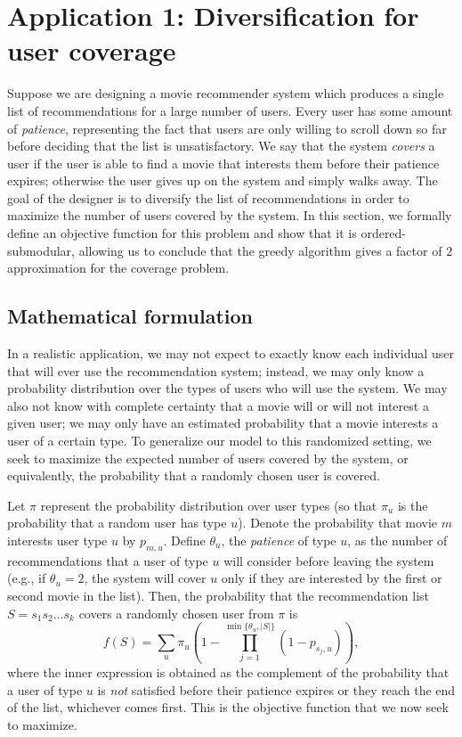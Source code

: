 
% 

\section{Application 1: Diversification for user coverage}\label{sec:coverage}

Suppose we are designing a movie recommender system which produces a single list of recommendations for a large number of users. Every user has some amount of \emph{patience}, representing the fact that users are only willing to scroll down so far before deciding that the list is unsatisfactory. We say that the system \emph{covers} a user if the user is able to find a movie that interests them before their patience expires; otherwise the user gives up on the system and simply walks away. The goal of the designer is to diversify the list of recommendations in order to maximize the number of users covered by the system. In this section, we formally define an objective function for this problem and show that it is ordered-submodular, allowing us to conclude that the greedy algorithm gives a factor of $2$ approximation for the coverage problem.


\subsection{Mathematical formulation}
In a realistic application, we may not expect to exactly know each individual user that will ever use the recommendation system; instead, we may only know a probability distribution over the types of users who will use the system. We may also not know with complete certainty that a movie will or will not interest a given user; we may only have an estimated probability that a movie interests a user of a certain type. To generalize our model to this randomized setting, we seek to maximize the expected number of users covered by the system, or equivalently, the probability that a randomly chosen user is covered.

Let $\pi$ represent the probability distribution over user types (so that $\pi_u$ is the probability that a random user has type $u$). Denote the probability that movie $m$ interests user type $u$ by $p_{m,u}$. Define $\theta_u$, the \emph{patience} of type $u$, as the number of recommendations that a user of type $u$ will consider before leaving the system (e.g., if $\theta_u = 2$, the system will cover $u$ only if they are interested by the first or second movie in the list). 
Then, the probability that the recommendation list $S=s_1 s_2\dots s_k$ covers a randomly chosen user from $\pi$ is $$f(S) = \sum_u \pi_u \left(1 - \prod_{j=1}^{\min \{\theta_u, |S|\}} (1 - p_{s_j, u}) \right),$$ where the inner expression is obtained as the complement of the probability that a user of type $u$ is \emph{not} satisfied before their patience expires or they reach the end of the list, whichever comes first. This is the objective function that we now seek to maximize.


